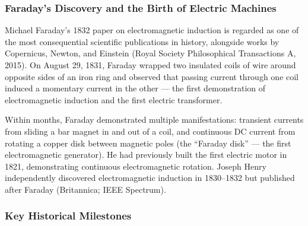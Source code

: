 \documentclass[11pt,letterpaper]{article}
\begin{document}
\subsubsection{Faraday's Discovery and the Birth of Electric Machines}

Michael Faraday's 1832 paper on electromagnetic induction is regarded as one of the most consequential scientific publications in history, alongside works by Copernicus, Newton, and Einstein (Royal Society Philosophical Transactions A, 2015). On August 29, 1831, Faraday wrapped two insulated coils of wire around opposite sides of an iron ring and observed that passing current through one coil induced a momentary current in the other --- the first demonstration of electromagnetic induction and the first electric transformer.

Within months, Faraday demonstrated multiple manifestations: transient currents from sliding a bar magnet in and out of a coil, and continuous DC current from rotating a copper disk between magnetic poles (the ``Faraday disk'' --- the first electromagnetic generator). He had previously built the first electric motor in 1821, demonstrating continuous electromagnetic rotation. Joseph Henry independently discovered electromagnetic induction in 1830--1832 but published after Faraday (Britannica; IEEE Spectrum).

\subsubsection{Key Historical Milestones}
\end{document}
